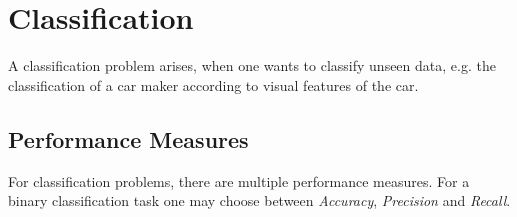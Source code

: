 \documentclass[12pt,a4paper]{article}
\begin{document}
\newpage
\section{Classification}

\noindent A classification problem arises, when one wants to classify unseen data, e.g. the classification of a car maker according to visual features of the car.\\

\subsection{Performance Measures}

\noindent For classification problems, there are multiple performance measures. For a binary classification task one may choose between \textit{Accuracy}, \textit{Precision} and \textit{Recall}.
\end{document}
